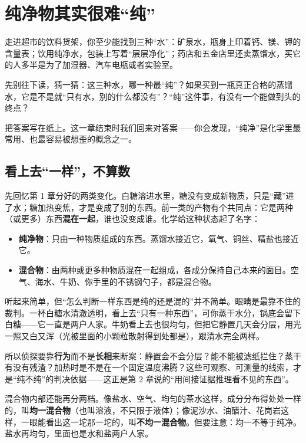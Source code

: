 \chapter{纯净物其实很难“纯”}

\begin{kaichang}
走进超市的饮料货架，你至少能找到三种“水”：矿泉水，瓶身上印着钙、镁、钾的含量表；饮用纯净水，包装上写着“层层净化”；药店和五金店里还卖蒸馏水，买它的人多半是为了加湿器、汽车电瓶或者实验室。

先别往下读，猜一猜：这三种水，哪一种最“纯”？如果买到一瓶真正合格的蒸馏水，它是不是就“只有水，别的什么都没有”？“纯”这件事，有没有一个能做到头的终点？

把答案写在纸上。这一章结束时我们回来对答案——你会发现，“纯净”是化学里最常用、也最容易被想歪的概念之一。
\end{kaichang}

\section{看上去“一样”，不算数}

先回忆第 1 章分好的两类变化。白糖溶进水里，糖没有变成新物质，只是“藏”进了水；糖加热变焦，才是变成了别的东西。前一类的产物有个共同点：它是两种（或更多）东西\textbf{混在一起}，谁也没变成谁。化学给这种状态起了名字：

\begin{itemize}[itemsep=2pt]
\item \textbf{纯净物}：只由一种物质组成的东西。蒸馏水接近它，氧气、铜丝、精盐也接近它。
\item \textbf{混合物}：由两种或更多种物质混在一起组成，各成分保持自己本来的面目。空气、海水、牛奶、你手里的不锈钢勺子，都是混合物。
\end{itemize}

听起来简单，但“怎么判断一样东西是纯的还是混的”并不简单。眼睛是最靠不住的裁判。一杯白糖水清澈透明，看上去“只有一种东西”，可你蒸干水分，锅底会留下白糖——它一直是两户人家。牛奶看上去也很均匀，但把它静置几天会分层，用光一照又白又浑（光被里面的小颗粒散射得到处都是），跟清水完全两样。

所以侦探要靠\textbf{行为}而不是\textbf{长相}来断案：静置会不会分层？能不能被滤纸拦住？蒸干有没有残渣？加热时是不是在一个固定温度沸腾？这些可观察、可测量的线索，才是“纯不纯”的判决依据——这正是第 2 章说的“用间接证据推理看不见的东西”。

混合物内部还能再分两档。像盐水、空气、均匀的茶水这样，成分分布得处处一样的，叫\textbf{均一混合物}（也叫溶液，不只限于液体）；像泥沙水、油醋汁、花岗岩这样，一眼能看出这一坨那一坨的，叫\textbf{不均一混合物}。但要注意：均一不等于纯净。盐水再均匀，里面也是水和盐两户人家。

